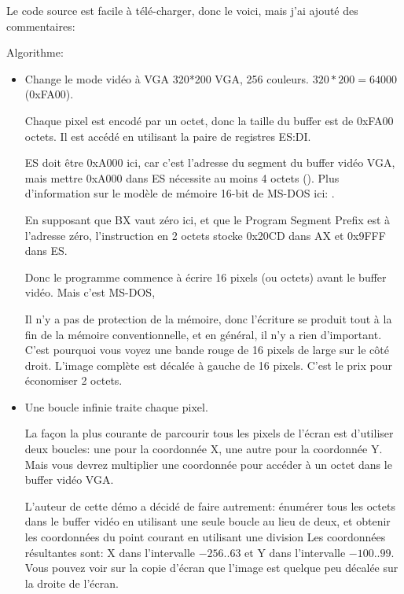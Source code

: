 %
Le code source est facile à télé-charger, donc le voici, mais j'ai ajouté des commentaires:



Algorithme:

\begin{itemize}
\item Change le mode vidéo à VGA 320*200 VGA, 256 couleurs. 
$320*200=64000$ (0xFA00). 

Chaque pixel est encodé par un octet, donc la taille du buffer est de 0xFA00 octets.
Il est accédé en utilisant la paire de registres ES:DI.

ES doit être 0xA000 ici, car c'est l'adresse du segment du buffer vidéo VGA, mais
mettre 0xA000 dans ES nécessite au moins 4 octets ().
Plus d'information sur le modèle de mémoire 16-bit de MS-DOS ici:
.


En supposant que BX vaut zéro ici, et que le Program Segment Prefix est à l'adresse
zéro, l'instruction en 2 octets  stocke 0x20CD dans AX et 0x9FFF
dans ES.

Donc le programme commence à écrire 16 pixels (ou octets) avant le buffer vidéo.
Mais c'est MS-DOS,

Il n'y a pas de protection de la mémoire, donc l'écriture se produit tout à la fin
de la mémoire conventionnelle, et en général, il n'y a rien d'important.
C'est pourquoi vous voyez une bande rouge de 16 pixels de large sur le côté droit.
L'image complète est décalée à gauche de 16 pixels.
C'est le prix pour économiser 2 octets.

\item Une boucle infinie traite chaque pixel.

La façon la plus courante de parcourir tous les pixels de l'écran est d'utiliser deux boucles:
une pour la coordonnée X, une autre pour la coordonnée Y.
Mais vous devrez multiplier une coordonnée pour accéder à un octet dans le buffer vidéo VGA.

L'auteur de cette démo a décidé de faire autrement: énumérer tous les octets dans
le buffer vidéo en utilisant une seule boucle au lieu de deux, et obtenir les coordonnées
du point courant en utilisant une division
Les coordonnées résultantes sont: X dans l'intervalle $-256..63$ et Y dans l'intervalle
$-100..99$.
Vous pouvez voir sur la copie d'écran que l'image est quelque peu décalée sur la
droite de l'écran.


\end{itemize}
